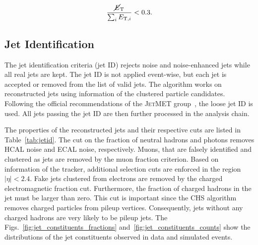 \begin{equation}
    \frac{\cancel{E}_{\mathrm{T}}}{\sum_i E_{\mathrm{T},i}} < 0.3.
\end{equation}

\subsection{Jet Identification}

The jet identification criteria (jet ID) rejects noise and noise-enhanced jets
while all real jets are kept. The jet ID is not applied event-wise, but each jet
is accepted or removed from the list of valid jets. The algorithm works on
reconstructed jets using information of the clustered particle candidates.
Following the official recommendations of the \textsc{JetMET}
group~\cite{jetmet:jetid}, the loose jet ID is used. All jets passing the jet ID
are then further processed in the analysis chain. 

The properties of the reconstructed jets and their respective cuts are listed in
Table~\ref{tab:jetid}. The cut on the fraction of neutral hadrons and photons
removes HCAL noise and ECAL noise, respectively. Muons, that are falsely
identified and clustered as jets are removed by the muon fraction criterion.
Based on information of the tracker, additional selection cuts are enforced in
the region $|\eta| < 2.4$. Fake jets clustered from electrons are removed by the
charged electromagnetic fraction cut. Furthermore, the fraction of charged hadrons in the
jet must be larger than zero. This cut is important since the CHS algorithm
removes charged particles from pileup vertices. Consequently, jets without any
charged hadrons are very likely to be pileup jets. The
Figs.~\ref{fig:jet_constituents_fractions} and~\ref{fig:jet_constituents_counts}
show the distributions of the jet constituents observed in data and simulated
events.

